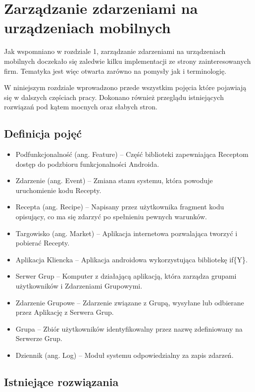 \documentclass[11pt,a4paper,polish,thesis]{dcsbook}
\begin{document}
\chapter{Zarządzanie zdarzeniami na urządzeniach mobilnych}
Jak wspomniano w rozdziale 1, zarządzanie zdarzeniami na urządzeniach mobilnych doczekało się zaledwie kilku implementacji ze strony zainteresowanych firm.
Tematyka jest więc otwarta zarówno na pomysły jak i terminologię.

W niniejszym rozdziale wprowadzono przede wszystkim pojęcia które pojawiają się w dalszych częściach pracy. Dokonano również przeglądu istniejących rozwiązań
pod kątem mocnych oraz słabych stron.

\section{Definicja pojęć}
\begin{itemize}
\item Podfunkcjonalność (ang. Feature) -- Część biblioteki zapewniająca Receptom dostęp do podzbioru funkcjonalności Androida.
\item Zdarzenie (ang. Event) -- Zmiana stanu systemu, która powoduje uruchomienie kodu Recepty.
\item Recepta (ang. Recipe) -- Napisany przez użytkownika fragment kodu opisujący, co ma się zdarzyć po spełnieniu pewnych warunków.
\item Targowisko (ang. Market) -- Aplikacja internetowa pozwalająca tworzyć i pobierać Recepty.
\item Aplikacja Kliencka -- Aplikacja androidowa wykorzystująca bibliotekę if\{Y\}. 
\item Serwer Grup -- Komputer z działającą aplikacją, która zarządza grupami użytkowników i Zdarzeniami Grupowymi.
\item Zdarzenie Grupowe -- Zdarzenie związane z Grupą, wysyłane lub odbierane przez Aplikację z Serwera Grup.
\item Grupa -- Zbiór użytkowników identyfikowalny przez nazwę zdefiniowany na Serwerze Grup.
\item Dziennik (ang. Log) -- Moduł systemu odpowiedzialny za zapis zdarzeń.
\end{itemize}
\section{Istniejące rozwiązania} %
\end{document}
